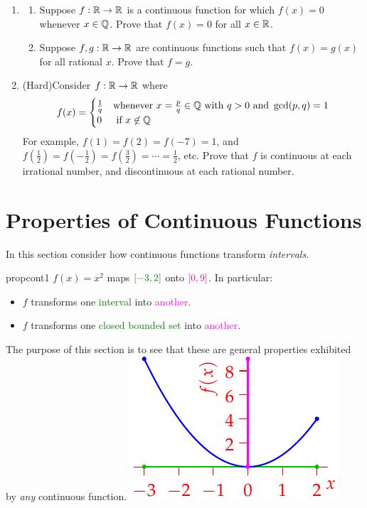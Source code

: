 \begin{exercisessec}{}{}
\begin{enumerate}
	\item%
	\begin{enumerate}
	  \item Suppose $f:\mathbb{R}\to\mathbb{R}$ is a continuous function for which $f(x)=0$ whenever $x\in\mathbb{Q}$. Prove that $f(x)=0$ for all $x\in\mathbb{R}$.
	  \item Suppose $f,g:\mathbb{R}\to\mathbb{R}$ are continuous functions such that $f(x)=g(x)$ for all rational $x$. Prove that $f=g$.  
	\end{enumerate}

	
	\item (Hard)\lstsp	Consider $f:\mathbb{R}\to\mathbb{R}$ where
	\[f(x)=\begin{cases}
	\frac 1q&\text{whenever }x=\frac pq\in\mathbb{Q}\text{ with }q>0\text{ and }\gcd(p,q)=1\\
	0&\text{ if }x\not\in\mathbb{Q}
	\end{cases}\]
  For example, $f(1)=f(2)=f(-7)=1$, and $f(\tfrac 12)=f(-\tfrac 12)=f(\tfrac 32)=\cdots=\frac 12$, etc. Prove that $f$ is continuous at each irrational number, and discontinuous at each rational number.	
  	
  	
\end{enumerate}
\end{exercisessec}

\clearpage



\section{Properties of Continuous Functions}

\def\range{\operatorname{range}}

In this section consider how continuous functions transform \emph{intervals.}

\begin{example}[lower separated=false, sidebyside, sidebyside align=top seam, sidebyside gap=0pt, righthand width=0.3\linewidth]{}{propcont1}
	$f(x)=x^2$ maps $\textcolor{Green}{[-3,2]}$ onto $\textcolor{magenta}{[0,9]}$. In particular:
	\begin{itemize}\itemsep0pt
	  \item $f$ transforms one \textcolor{Green}{interval} into \textcolor{magenta}{another}.
	  \item $f$ transforms one \textcolor{Green}{closed bounded set} into \textcolor{magenta}{another}.
	\end{itemize}
	The purpose of this section is to see that these are general properties exhibited by \emph{any} continuous function. 
	\tcblower
	\flushright\includegraphics[scale=0.9]{properties-ex1}
\end{example}


